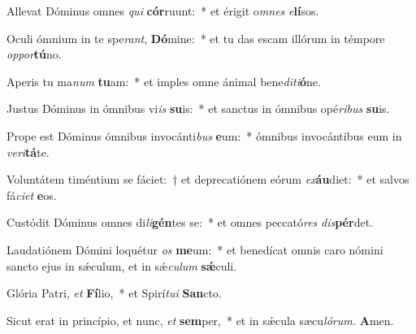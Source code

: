 \item Allevat Dóminus omnes \textit{qui} \textbf{cór}ruunt:~* et érigit o\textit{mnes} \textit{e}\textbf{lí}sos.
\item Oculi ómnium in te spe\textit{rant}, \textbf{Dó}mine:~* et tu das escam illórum in témpore \textit{oppor}\textbf{tú}no.
\item Aperis tu ma\textit{num} \textbf{tu}am:~* et imples omne ánimal bene\textit{diti}\textbf{ó}ne.
\item Justus Dóminus in ómnibus vi\textit{is} \textbf{su}is:~* et sanctus in ó\-mnibus opé\textit{ribus} \textbf{su}is.
\item Prope est Dóminus ómnibus invocánti\textit{bus} \textbf{e}um:~* ó\-mnibus invocántibus eum in \textit{veri}\textbf{tá}te.
\item Voluntátem timéntium se fáciet:~† et deprecatiónem eórum \textit{ex}\textbf{áu}diet:~* et salvos fá\textit{ciet} \textbf{e}os.
\item Custódit Dóminus omnes di\textit{li}\textbf{gén}tes se:~* et o\-mnes peccató\textit{res} \textit{dis}\textbf{pér}det.
\item Laudatiónem Dómini loquétur \textit{os} \textbf{me}um:~* et benedícat o\-mnis caro nómini sancto ejus in sǽculum, et in sǽ\hspace*{0.02em}\textit{cu}\textit{lum} \textbf{sǽ}culi.
\item Glória Patri, \textit{et} \textbf{Fí}lio,~* et Spirí\hspace{0.03em}\textit{tui} \textbf{San}cto.
\item Sicut erat in princípio, et nunc, \textit{et} \textbf{sem}per,~* et in sǽcula sæcu\hspace{0.03em}\textit{lórum.} \textbf{A}men.